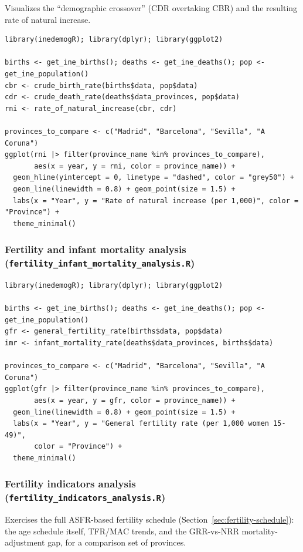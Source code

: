 \documentclass[11pt]{article}
\newcommand{\fn}[1]{\texttt{#1}}
\begin{document}
Visualizes the ``demographic crossover'' (CDR overtaking CBR) and the
resulting rate of natural increase.

\begin{lstlisting}
library(inedemogR); library(dplyr); library(ggplot2)

births <- get_ine_births(); deaths <- get_ine_deaths(); pop <- get_ine_population()
cbr <- crude_birth_rate(births$data, pop$data)
cdr <- crude_death_rate(deaths$data_provinces, pop$data)
rni <- rate_of_natural_increase(cbr, cdr)

provinces_to_compare <- c("Madrid", "Barcelona", "Sevilla", "A Coruna")
ggplot(rni |> filter(province_name %in% provinces_to_compare),
       aes(x = year, y = rni, color = province_name)) +
  geom_hline(yintercept = 0, linetype = "dashed", color = "grey50") +
  geom_line(linewidth = 0.8) + geom_point(size = 1.5) +
  labs(x = "Year", y = "Rate of natural increase (per 1,000)", color = "Province") +
  theme_minimal()
\end{lstlisting}

\subsubsection{Fertility and infant mortality analysis (\fn{fertility\_infant\_mortality\_analysis.R})}

\begin{lstlisting}
library(inedemogR); library(dplyr); library(ggplot2)

births <- get_ine_births(); deaths <- get_ine_deaths(); pop <- get_ine_population()
gfr <- general_fertility_rate(births$data, pop$data)
imr <- infant_mortality_rate(deaths$data_provinces, births$data)

provinces_to_compare <- c("Madrid", "Barcelona", "Sevilla", "A Coruna")
ggplot(gfr |> filter(province_name %in% provinces_to_compare),
       aes(x = year, y = gfr, color = province_name)) +
  geom_line(linewidth = 0.8) + geom_point(size = 1.5) +
  labs(x = "Year", y = "General fertility rate (per 1,000 women 15-49)",
       color = "Province") +
  theme_minimal()
\end{lstlisting}

\subsubsection{Fertility indicators analysis (\fn{fertility\_indicators\_analysis.R})}

Exercises the full ASFR-based fertility schedule (Section~\ref{sec:fertility-schedule}):
the age schedule itself, TFR/MAC trends, and the GRR-vs-NRR mortality-adjustment
gap, for a comparison set of provinces.
\end{document}

